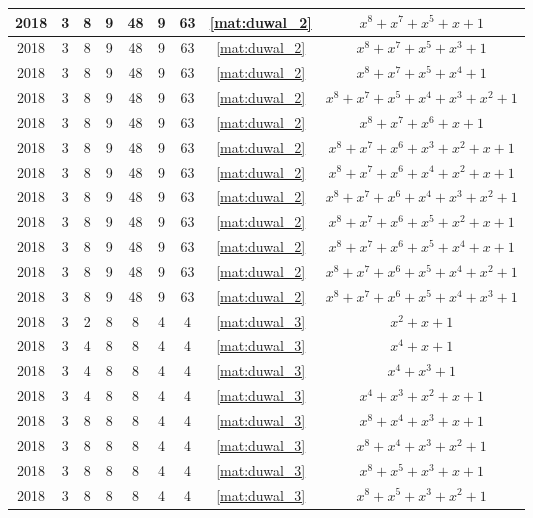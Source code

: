 \begin{longtable}{|c|c|c|c|c|c|c|c|c|}
2018 & 3 & 8 & 9 & 48 & 9 & 63 & \eqref{mat:duwal_2} & $x^8 + x^7 + x^5 + x + 1$ \\ \hline 
2018 & 3 & 8 & 9 & 48 & 9 & 63 & \eqref{mat:duwal_2} & $x^8 + x^7 + x^5 + x^3 + 1$ \\ \hline 
2018 & 3 & 8 & 9 & 48 & 9 & 63 & \eqref{mat:duwal_2} & $x^8 + x^7 + x^5 + x^4 + 1$ \\ \hline 
2018 & 3 & 8 & 9 & 48 & 9 & 63 & \eqref{mat:duwal_2} & $x^8 + x^7 + x^5 + x^4 + x^3 + x^2 + 1$ \\ \hline 
2018 & 3 & 8 & 9 & 48 & 9 & 63 & \eqref{mat:duwal_2} & $x^8 + x^7 + x^6 + x + 1$ \\ \hline 
2018 & 3 & 8 & 9 & 48 & 9 & 63 & \eqref{mat:duwal_2} & $x^8 + x^7 + x^6 + x^3 + x^2 + x + 1$ \\ \hline 
2018 & 3 & 8 & 9 & 48 & 9 & 63 & \eqref{mat:duwal_2} & $x^8 + x^7 + x^6 + x^4 + x^2 + x + 1$ \\ \hline 
2018 & 3 & 8 & 9 & 48 & 9 & 63 & \eqref{mat:duwal_2} & $x^8 + x^7 + x^6 + x^4 + x^3 + x^2 + 1$ \\ \hline 
2018 & 3 & 8 & 9 & 48 & 9 & 63 & \eqref{mat:duwal_2} & $x^8 + x^7 + x^6 + x^5 + x^2 + x + 1$ \\ \hline 
2018 & 3 & 8 & 9 & 48 & 9 & 63 & \eqref{mat:duwal_2} & $x^8 + x^7 + x^6 + x^5 + x^4 + x + 1$ \\ \hline 
2018 & 3 & 8 & 9 & 48 & 9 & 63 & \eqref{mat:duwal_2} & $x^8 + x^7 + x^6 + x^5 + x^4 + x^2 + 1$ \\ \hline 
2018 & 3 & 8 & 9 & 48 & 9 & 63 & \eqref{mat:duwal_2} & $x^8 + x^7 + x^6 + x^5 + x^4 + x^3 + 1$ \\ \hline 
2018 & 3 & 2 & 8 & 8 & 4 & 4 & \eqref{mat:duwal_3} & $x^2 + x + 1$ \\ \hline 
2018 & 3 & 4 & 8 & 8 & 4 & 4 & \eqref{mat:duwal_3} & $x^4 + x + 1$ \\ \hline 
2018 & 3 & 4 & 8 & 8 & 4 & 4 & \eqref{mat:duwal_3} & $x^4 + x^3 + 1$ \\ \hline 
2018 & 3 & 4 & 8 & 8 & 4 & 4 & \eqref{mat:duwal_3} & $x^4 + x^3 + x^2 + x + 1$ \\ \hline 
2018 & 3 & 8 & 8 & 8 & 4 & 4 & \eqref{mat:duwal_3} & $x^8 + x^4 + x^3 + x + 1$ \\ \hline 
2018 & 3 & 8 & 8 & 8 & 4 & 4 & \eqref{mat:duwal_3} & $x^8 + x^4 + x^3 + x^2 + 1$ \\ \hline 
2018 & 3 & 8 & 8 & 8 & 4 & 4 & \eqref{mat:duwal_3} & $x^8 + x^5 + x^3 + x + 1$ \\ \hline 
2018 & 3 & 8 & 8 & 8 & 4 & 4 & \eqref{mat:duwal_3} & $x^8 + x^5 + x^3 + x^2 + 1$ \\ \hline 

\end{longtable}
